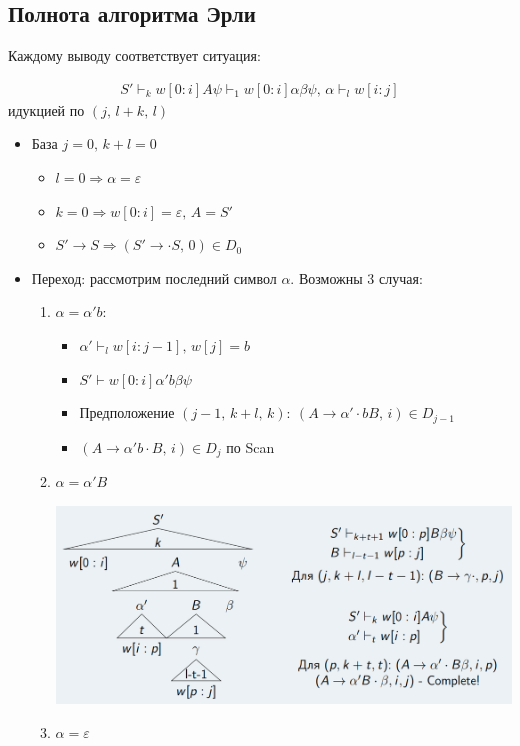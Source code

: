 \documentclass[a4paper,12pt]{article}
\theoremstyle{plain}
\theoremstyle{definition}
\theoremstyle{remark}
\begin{document}
\subsection{Полнота алгоритма Эрли}
Каждому выводу соответствует ситуация:

\begin{align*}
	S' \vdash_k w[0:i]A\psi \vdash_1 w[0:i]\alpha\beta\psi,\, \alpha\vdash_l w[i:j]
\end{align*}
идукцией по $(j,\, l + k,\, l)$
\begin{itemize}
	\item База $j = 0,\, k + l = 0$
	      \begin{itemize}
		      \item $l = 0 \Rightarrow \alpha = \varepsilon$
		      \item $k = 0 \Rightarrow w[0:i] = \varepsilon,\, A = S'$
		      \item $S' \to S \Rightarrow (S' \to \cdot S,\, 0) \in D_0$
	      \end{itemize}
	\item Переход: рассмотрим последний символ $\alpha$. Возможны 3 случая:
	      \begin{enumerate}
		      \item $\alpha = \alpha' b$:
		            \begin{itemize}
			            \item $\alpha' \vdash_l w[i : j-1],\, w[j] = b$
			            \item $S' \vdash w[0:i]\alpha'b\beta\psi$
			            \item Предположение $(j - 1,\, k+l,\,k):\: (A \to \alpha'\cdot bB,\, i) \in D_{j - 1}$
			            \item $(A \to \alpha'b\cdot B,\, i) \in D_j$ по Scan
		            \end{itemize}
		      \item $\alpha = \alpha' B$

		            \includegraphics[scale=0.35]{assets/FullERli2.png}
		      \item $\alpha = \varepsilon$


\end{enumerate}
\end{itemize}
\end{document}
